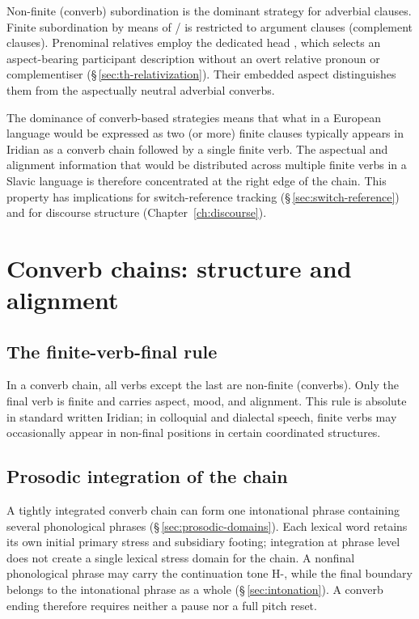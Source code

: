 Non-finite (converb) subordination is the dominant strategy for adverbial
clauses. Finite subordination by means of / is restricted to
argument clauses (complement clauses). Prenominal relatives employ the dedicated head , which selects
an aspect-bearing participant description without an overt relative pronoun
or complementiser (§\,\ref{sec:th-relativization}). Their embedded aspect
distinguishes them from the aspectually neutral adverbial converbs.

The dominance of converb-based strategies means that what in a European language
would be expressed as two (or more) finite clauses typically appears in Iridian
as a converb chain followed by a single finite verb. The aspectual and alignment
information that would be distributed across multiple finite verbs in a Slavic
language is therefore concentrated at the right edge of the chain. This property
has implications for switch-reference tracking (§\,\ref{sec:switch-reference})
and for discourse structure (Chapter~\ref{ch:discourse}).

\section{Converb chains: structure and alignment}\label{sec:converb-chains}

\subsection{The finite-verb-final rule}

In a converb chain, all verbs except the last are non-finite (converbs). Only
the final verb is finite and carries aspect, mood, and alignment. This rule is
absolute in standard written Iridian; in colloquial and dialectal speech, finite
verbs may occasionally appear in non-final positions in certain coordinated
structures.

\subsection{Prosodic integration of the chain}\label{sec:converb-phrasing}

A tightly integrated converb chain can form one intonational phrase containing
several phonological phrases (§\,\ref{sec:prosodic-domains}). Each lexical
word retains its own initial primary stress and subsidiary footing; integration
at phrase level does not create a single lexical stress domain for the chain.
A nonfinal phonological phrase may carry the continuation tone H-, while the
final boundary belongs to the intonational phrase as a whole
(§\,\ref{sec:intonation}). A converb ending therefore requires neither a
pause nor a full pitch reset.

